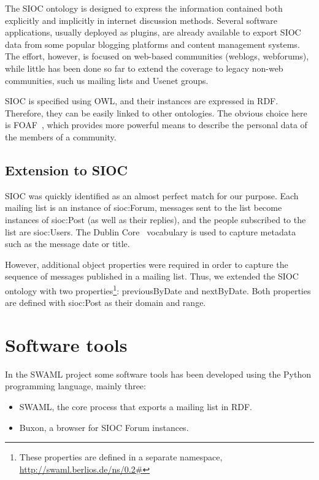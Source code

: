 \documentclass{llncs}
\begin{document}
The SIOC ontology is designed to express the information contained
both explicitly  and implicitly in internet discussion methods. Several 
software applications, usually deployed as plugins, are already available 
to export SIOC data from some popular blogging platforms and content 
management systems. The effort, however, is focused on web-based communities 
(weblogs, webforums), while little has been done so far to extend the coverage 
to legacy non-web communities, such us mailing lists and Usenet groups.

SIOC is specified using OWL, and their instances are expressed
in RDF. Therefore, they can be easily linked to other ontologies.
The obvious choice here is FOAF~\cite{FOAF}, which provides more
powerful means to describe the personal data of the members of
a community.

\subsection{Extension to SIOC}

SIOC was quickly identified as an almost perfect match for our
purpose. Each mailing list is an instance of \textsf{sioc:Forum},
messages sent to the list become instances of \textsf{sioc:Post}
(as well as their replies), and the people subscribed to the
list are \textsf{sioc:User}s. The Dublin Core~\cite{DublinCore}
vocabulary is used to capture metadata such as the message
date or title.

However, additional object properties were required
in order to capture the sequence of messages published in a
mailing list. Thus, we extended the SIOC ontology with two
properties\footnote{These properties are defined in a separate
namespace, \url{http://swaml.berlios.de/ns/0.2\#}}:
\textsf{previousByDate} and \textsf{nextByDate}. Both properties
are defined with \textsf{sioc:Post} as their domain and range.

\section{\label{sec:tools}Software tools}

In the SWAML project some software tools has been developed using the Python 
programming language, mainly three:

\begin{itemize}
 \item SWAML, the core process that exports a mailing list in RDF.
 \item Buxon, a browser for SIOC Forum instances.
\end{itemize}
\end{document}
